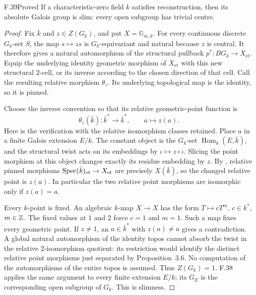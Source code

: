 \begin{claim}{F.39}{Proved}
If a characteristic-zero field $k$ satisfies reconstruction,
then its absolute Galois group is slim: every open subgroup
has trivial centre.
\end{claim}
\begin{proof}
Fix $\bar k$ and $z\in Z(G_k)$, and put $X=\mathbb G_{m,k}$.
For every continuous discrete $G_k$-set $S$, the map
$s\mapsto zs$ is $G_k$-equivariant and natural because $z$
is central. It therefore gives a natural automorphism of the
structural pullback $p^*:BG_k\to X_{\mathrm{et}}$.
Equip the underlying identity geometric morphism of
$X_{\mathrm{et}}$ with this new structural $2$-cell, or its
inverse according to the chosen direction of that cell.
Call the resulting relative morphism $\theta_z$.
Its underlying topological map is the identity, so it is pinned.

Choose the inverse convention so that its relative geometric-point
function is
\[
 \theta_z(\bar k):\bar k^*\longrightarrow\bar k^*,
             \qquad a\longmapsto z(a).
\]
Here is the verification with the relative isomorphism classes
retained. Place $a$ in a finite Galois extension $E/k$.
The constant object is the $G_k$-set
$\operatorname{Hom}_k(E,\bar k)$, and the structural twist
acts on its embeddings by $\iota\mapsto z\circ\iota$.
Slicing the point morphism at this object changes exactly its
residue embedding by $z$. By
\citet[Proposition~3.6]{F_CHW2024}, relative pinned morphisms
$\operatorname{Spec}(\bar k)_{\mathrm{et}}\to X_{\mathrm{et}}$ are precisely
$X(\bar k)$, so the changed relative point is $z(a)$.
In particular the two relative point morphisms are isomorphic
only if $z(a)=a$.

Every $k$-point is fixed. An algebraic $k$-map $X\to X$
has the form $T\mapsto cT^m$, $c\in k^*$, $m\in\mathbb Z$.
The fixed values at $1$ and $2$ force $c=1$ and $m=1$.
Such a map fixes every geometric point. If $z\ne1$, an
$a\in\bar k^*$ with $z(a)\ne a$ gives a contradiction.
A global natural automorphism of the identity topos cannot
absorb the twist in the relative $2$-isomorphism quotient:
its restriction would identify the distinct relative point
morphisms just separated by Proposition~3.6. No computation
of the automorphisms of the entire topos is assumed.
Thus $Z(G_k)=1$. F.38 applies the same argument to every
finite extension $E/k$; its $G_E$ is the corresponding open
subgroup of $G_k$. This is slimness.
\end{proof}

